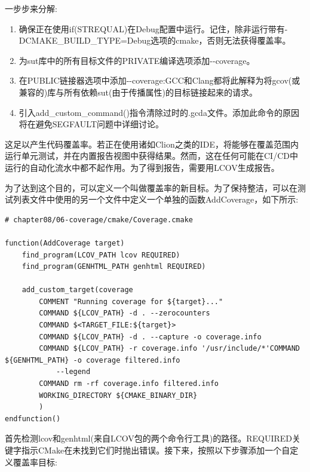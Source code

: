 一步步来分解:

\begin{enumerate}
\item 
确保正在使用if(STREQUAL)在Debug配置中运行。记住，除非运行带有-DCMAKE\_BUILD\_TYPE=Debug选项的cmake，否则无法获得覆盖率。

\item 
为sut库中的所有目标文件的PRIVATE编译选项添加-{}-coverage。

\item 
在PUBLIC链接器选项中添加-{}-coverage:GCC和Clang都将此解释为将gcov(或兼容的)库与所有依赖sut(由于传播属性)的目标链接起来的请求。

\item 
引入add\_custom\_command()指令清除过时的.gcda文件。添加此命令的原因将在避免SEGFAULT问题中详细讨论。
\end{enumerate}

这足以产生代码覆盖率。若正在使用诸如Clion之类的IDE，将能够在覆盖范围内运行单元测试，并在内置报告视图中获得结果。然而，这在任何可能在CI/CD中运行的自动化流水中都不起作用。为了得到报告，需要用LCOV生成报告。

为了达到这个目的，可以定义一个叫做覆盖率的新目标。为了保持整洁，可以在测试列表文件中使用的另一个文件中定义一个单独的函数AddCoverage，如下所示:

\begin{lstlisting}[style=styleCMake]
# chapter08/06-coverage/cmake/Coverage.cmake

function(AddCoverage target)
	find_program(LCOV_PATH lcov REQUIRED)
	find_program(GENHTML_PATH genhtml REQUIRED)
	
	add_custom_target(coverage
		COMMENT "Running coverage for ${target}..."
		COMMAND ${LCOV_PATH} -d . --zerocounters
		COMMAND $<TARGET_FILE:${target}>
		COMMAND ${LCOV_PATH} -d . --capture -o coverage.info
		COMMAND ${LCOV_PATH} -r coverage.info '/usr/include/*'COMMAND ${GENHTML_PATH} -o coverage filtered.info
			--legend
		COMMAND rm -rf coverage.info filtered.info
		WORKING_DIRECTORY ${CMAKE_BINARY_DIR}
		)
endfunction()
\end{lstlisting}

首先检测lcov和genhtml(来自LCOV包的两个命令行工具)的路径。REQUIRED关键字指示CMake在未找到它们时抛出错误。接下来，按照以下步骤添加一个自定义覆盖率目标:

